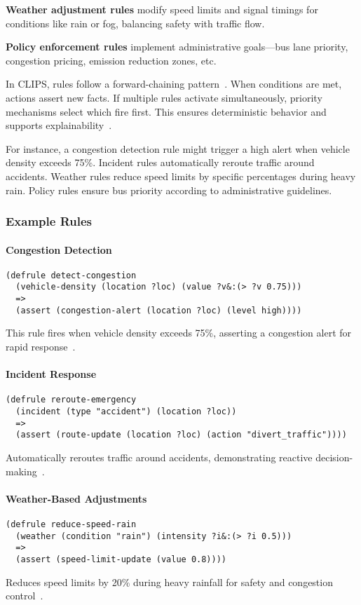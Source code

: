 \documentclass{article}
\begin{document}
\textbf{Weather adjustment rules} modify speed limits and signal timings for conditions like rain or fog, balancing safety with traffic flow.

\textbf{Policy enforcement rules} implement administrative goals—bus lane priority, congestion pricing, emission reduction zones, etc.

In CLIPS, rules follow a forward-chaining pattern~\cite{karagiannis_wissensmanagement_2001}. When conditions are met, actions assert new facts. If multiple rules activate simultaneously, priority mechanisms select which fire first. This ensures deterministic behavior and supports explainability~\cite{spillo_neuro_symbolic_2024}.

For instance, a congestion detection rule might trigger a high alert when vehicle density exceeds 75\%. Incident rules automatically reroute traffic around accidents. Weather rules reduce speed limits by specific percentages during heavy rain. Policy rules ensure bus priority according to administrative guidelines.

\subsubsection{Example Rules}

\paragraph{Congestion Detection}
\begin{verbatim}
(defrule detect-congestion
  (vehicle-density (location ?loc) (value ?v&:(> ?v 0.75)))
  =>
  (assert (congestion-alert (location ?loc) (level high))))
\end{verbatim}
This rule fires when vehicle density exceeds 75\%, asserting a congestion alert for rapid response~\cite{jiang_spatiotemporal_2017}.

\paragraph{Incident Response}
\begin{verbatim}
(defrule reroute-emergency
  (incident (type "accident") (location ?loc))
  =>
  (assert (route-update (location ?loc) (action "divert_traffic"))))
\end{verbatim}
Automatically reroutes traffic around accidents, demonstrating reactive decision-making~\cite{epj_scaling_2024}.

\paragraph{Weather-Based Adjustments}
\begin{verbatim}
(defrule reduce-speed-rain
  (weather (condition "rain") (intensity ?i&:(> ?i 0.5)))
  =>
  (assert (speed-limit-update (value 0.8))))
\end{verbatim}
Reduces speed limits by 20\% during heavy rainfall for safety and congestion control~\cite{spillo_neuro_symbolic_2024}.
\end{document}
